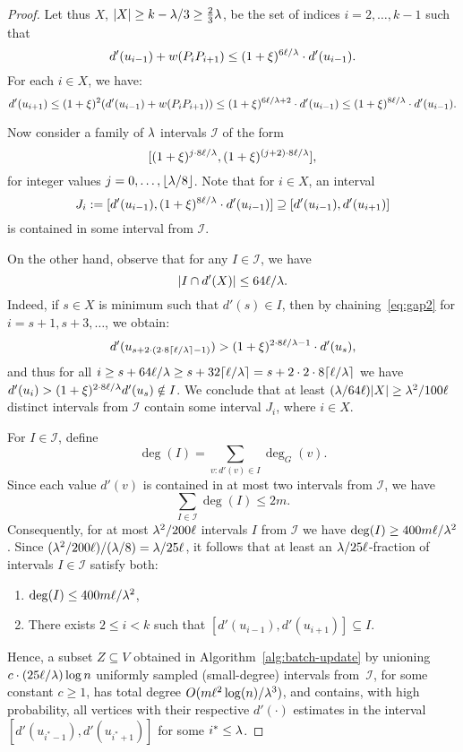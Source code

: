 \documentclass[11pt,letterpaper]{article}
\theoremstyle{plain}
\renewcommand{\O}{O}
\newcommand{\wei}{w}
\begin{document}
\begin{proof}
  Let thus $X$, $|X|\geq k-\lambda/3\geq \frac{2}{3}\lambda$, be the set of indices $i=2,\ldots,k-1$ such that
  \[ d'(u_{i-1})+\wei(P_iP_{i+1})\leq (1+\epsp)^{6\ell/\bal}\cdot d'(u_{i-1}). \]
  For each $i\in X$, we have:
  \[ d'(u_{i+1})\leq (1+\epsp)^2(d'(u_{i-1})+\wei(P_{i}P_{i+1})) \leq
  (1+\epsp)^{6\ell/\bal+2}\cdot d'(u_{i-1})\leq (1+\epsp)^{8\ell/\bal}\cdot d'(u_{i-1}). \]
  
  Now consider a family of $\lambda$ intervals $\mathcal{I}$ of the form
  \[[(1+\xi)^{j\cdot 8\ell/\lambda}, (1+\xi)^{(j+2)\cdot 8\ell/\lambda}],\]
  for integer values $j=0,\ldots,\lfloor \lambda/8\rfloor$. Note that for $i\in X$, an interval
  \[ J_i := [d'(u_{i-1}),(1+\xi)^{8\ell/\lambda}\cdot d'(u_{i-1})]\supseteq [d'(u_{i-1}),d'(u_{i+1})] \]
  is contained in some interval from $\mathcal{I}$.
  
  On the other hand, observe that for any $I\in \mathcal{I}$, we have
  \[|I\cap d'(X)|\leq 64 \ell/\lambda.\]
  Indeed, if $s\in X$ is minimum such that $d'(s)\in I$, then by chaining~\eqref{eq:gap2} for
  $i=s+1,s+3,\ldots$, we obtain:
  \[ d'(u_{s+2\cdot (2\cdot 8\lceil \ell/\lambda\rceil-1) })>(1+\xi)^{2\cdot 8\ell/\lambda-1}\cdot d'(u_{s}),\]
  and thus for all $i\geq s+64\ell/\lambda\geq s+32\lceil \ell/\lambda\rceil =s+2\cdot 2\cdot 8\lceil\ell/\lambda\rceil$ we have $d'(u_i)>(1+\xi)^{2\cdot 8\ell/\lambda}d'(u_s)\notin I$.
  We conclude that at least $(\lambda/64\ell)|X|\geq \lambda^2/100\ell$ distinct intervals from $\mathcal{I}$ contain some interval $J_i$, where $i\in X$.

  For $I\in \mathcal{I}$, define
  \[ \deg(I)=\sum_{v:d'(v)\in I}\deg_G(v). \]
  Since each value $d'(v)$ is contained in at most two intervals from $\mathcal{I}$, 
  we have \[\sum_{I\in\mathcal{I}} \deg(I)\leq 2m.\]
  Consequently, for at most $\lambda^2/200\ell$ intervals $I$ from $\mathcal{I}$
  we have $\deg(I)\geq 400m\ell/\lambda^2$.
  Since \linebreak $(\lambda^2/200\ell)/(\lambda/8)=\lambda/25\ell$, it follows that at least an $\lambda/25\ell$-fraction of intervals $I\in\mathcal{I}$ satisfy both:
  \begin{enumerate}
    \item $\deg(I)\leq 400m\ell/\lambda^2$,
    \item There exists $2\leq i<k$ such that $[d'(u_{i-1}),d'(u_{i+1})]\subseteq I$.
  \end{enumerate}
  Hence, a subset $Z\subseteq V$ obtained in Algorithm~\ref{alg:batch-update} by unioning $c\cdot (25\ell/\lambda)\log{n}$ uniformly sampled (small-degree) intervals from~$\mathcal{I}$, for some constant $c\geq 1$,
  has total degree $\O(m\ell^2\log(n)/\bal^3)$, and contains, 
  with high probability, all vertices with their respective $d'(\cdot)$ estimates in the interval
  $[d'(u_{i^*-1}),d'(u_{i^*+1})]$ for some $i^*\leq \lambda$.
  

\end{proof}
\end{document}
